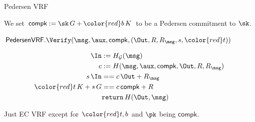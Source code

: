 \documentclass{beamer}
\def\compk{\ensuremath{\mathsf{compk}}\xspace}
\begin{document}
\begin{frame}
\begin{columns}
\begin{column}[t]{0.3\textwidth}
    \end{column}
\end{columns}

\end{frame}



\begin{frame}{Pedersen VRF}

We set $\compk := \sk \, G + {\color{red} b \, K}$ to be a Pedersen commitment to $\sk$.

\bigskip\bigskip

$\mathsf{PedersenVRF}.\Verify(\msg,\aux,\compk,(\Out,R,R_\msg,s,{\color{red} t}))$
	
$$ \begin{aligned}
\In &:= H_{\mathcal{G}}(\msg) \\
c &:= H(\msg,\aux,\compk,\Out,R,R_\msg) \\
s \, \In &== c \, \Out + R_\msg \\
{\color{red} t \, K} + s \, G &== c \, \compk + R \\
& \mathtt{return} \, H(\Out,\msg) \\
\end{aligned} $$

\bigskip \bigskip

Just EC VRF except for $\color{red} t, b$ and $\pk$ being $\compk$.

\end{frame}
\end{document}
